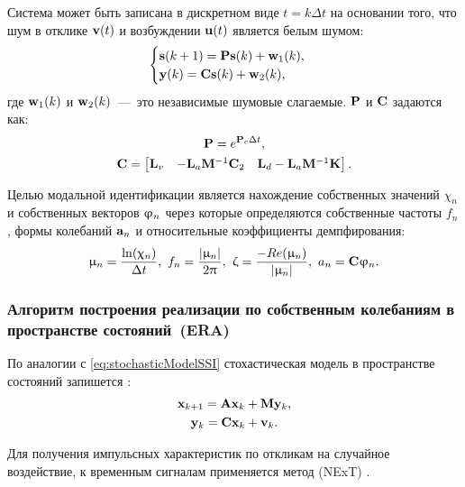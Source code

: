 Система может быть записана в дискретном виде $ t = k \Delta t $ на основании того, что шум в отклике $ \mathbf{v}(t) $ и возбуждении $ \mathbf{u}(t) $ является белым шумом:
\begin{equation}
	\begin{cases}
		\mathbf{s}(k + 1) = \mathbf{P} \mathbf{s}(k) + \mathbf{w}_1(k), \\
		\mathbf{y}(k) = \mathbf{C} \mathbf{s}(k) + \mathbf{w}_2(k),
	\end{cases}
\end{equation}
где $ \mathbf{w}_1(k) $ и $ \mathbf{w}_2(k) $~---~это независимые шумовые слагаемые. $ \mathbf{P} $ и $ \mathbf{C} $ задаются как:
\begin{gather}
	\mathbf{P} = e ^ {\mathbf{P}_c \Delta t}, \\
	\mathbf{C} = 
	\begin{bmatrix} 
		\mathbf{L}_v & -\mathbf{L}_a \mathbf{M} ^ {-1} \mathbf{C}_2 & \mathbf{L}_d - \mathbf{L}_a \mathbf{M} ^ {-1} \mathbf{K}
	\end{bmatrix}.
\end{gather}

Целью модальной идентификации является нахождение собственных значений $ \chi_n $ и собственных векторов $ \mathbf{\upvarphi}_n $ через которые определяются собственные частоты $ f_n $, формы колебаний $ \mathbf{a}_n $ и относительные коэффициенты демпфирования:
\begin{equation}
	\upmu_n = \frac{\ln(\upchi_n)}{\Delta t}, \ f_n = \frac{|\upmu_n|}{2 \uppi}, \ \upzeta = \frac{-Re(\upmu_n)}{|\upmu_n|}, \ a_n = \mathbf{C} \mathbf{\upvarphi}_n.
\end{equation}

\subsubsection{Алгоритм построения реализации по собственным колебаниям в пространстве состояний~(ERA)}

По аналогии с \eqref{eq:stochasticModelSSI} стохастическая модель в пространстве состояний запишется \cite{lib:oma:Juang}:
\begin{gather}
	\mathbf{x}_{k + 1} = \mathbf{A} \mathbf{x}_k + \mathbf{M} \mathbf{y}_k, \\
	\mathbf{y}_k = \mathbf{C} \mathbf{x}_k + \mathbf{v}_k.
\end{gather}

Для получения импульсных характеристик по откликам на случайное воздействие, к временным сигналам применяется метод  (NExT) \cite{lib:oma:Lin}. 

